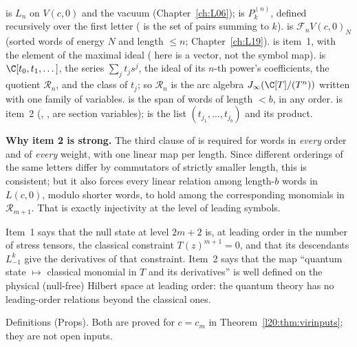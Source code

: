 \begin{dictionary}
 is $L_n$ on $V(c,0)$ and  the vacuum (Chapter~\ref{ch:L06});  is
$P^{(n)}_k$, defined recursively over the first letter ( is the set of pairs summing to $k$).
 is $\mathcal F_nV(c,0)_N$ (sorted words of energy $N$ and length $\le n$; Chapter~\ref{ch:L19}).
 is item~1, with  the element of the maximal ideal ( here is a vector, not the
symbol map).  is $\C[t_0,t_1,\dots]$,  the series $\sum_jt_js^j$,  the ideal of its
$n$-th power's coefficients,  the quotient $\mathcal R_n$, and  the class of $t_j$; so $\mathcal R_n$ is the arc
algebra $\ltwentyJ(\C[T]/(T^n))$ written with one family of variables.  is the span of words of length $<b$, in any
order.  is item~2 (, ,  are section variables);  is the list
$(t_{j_1},\dots,t_{j_b})$ and  its product.

\textbf{Why item 2 is strong.} The third clause of  is required for words in \emph{every} order and of \emph{every} weight, with one
linear map per length. Since different orderings of the same letters differ by commutators of strictly smaller length,
this is consistent; but it also forces every linear relation among length-$b$ words in $L(c,0)$, modulo shorter words, to hold
among the corresponding monomials in $\mathcal R_{m+1}$. That is exactly injectivity at the level of leading symbols.
\end{dictionary}

\begin{physics}
Item~1 says that the null state at level $2m+2$ is, at leading order in the number of stress tensors, the classical constraint
$T(z)^{m+1}=0$, and that its descendants $L_{-1}^k$ give the derivatives of that constraint. Item~2 says that the map ``quantum
state $\mapsto$ classical monomial in $T$ and its derivatives'' is well defined on the physical (null-free) Hilbert space at leading
order: the quantum theory has no leading-order relations beyond the classical ones.
\end{physics}

\begin{status}
Definitions (Props). Both are proved for $c=c_m$ in Theorem~\ref{l20:thm:virinputs}; they are not open inputs.
\end{status}

